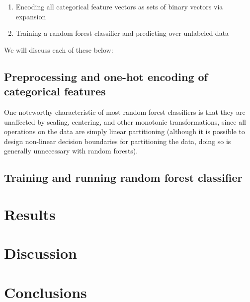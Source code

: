 \documentclass[11pt,a4paper]{article}
\begin{document}
\begin{enumerate}
  \item Encoding all categorical feature vectors as sets of binary vectors via expansion 
  \item Training a random forest classifier and predicting over unlabeled data
\end{enumerate}

We will discuss each of these below:

\subsection{Preprocessing and one-hot encoding of categorical features}
One noteworthy characteristic of most random forest classifiers is that they are unaffected by scaling, centering, and other monotonic transformations, since all operations on the data are simply linear partitioning (although it is possible to design non-linear decision boundaries for partitioning the data, doing so is generally unnecessary with random forests).

\subsection{Training and running random forest classifier}
  
\section{Results}

\section{Discussion}

\section{Conclusions}
\end{document}
